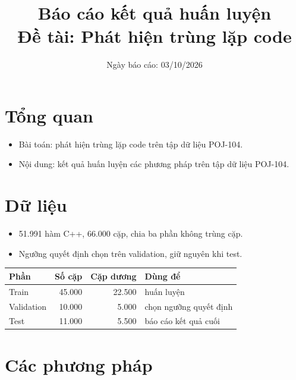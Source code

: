 \documentclass[11pt,a4paper]{article}
\title{\vspace{-1.0cm}\textbf{Báo cáo kết quả huấn luyện}\\[6pt]
       {\normalsize Đề tài: Phát hiện trùng lặp code}}
\date{Ngày báo cáo: 03/10/2026}
\begin{document}
\maketitle
\vspace{-0.8cm}

\section{Tổng quan}

\begin{itemize}
\item Bài toán: phát hiện trùng lặp code trên tập dữ liệu POJ-104.
\item Nội dung: kết quả huấn luyện các phương pháp trên tập dữ liệu POJ-104.
\end{itemize}

\section{Dữ liệu}

\begin{itemize}
\item 51.991 hàm C++, 66.000 cặp, chia ba phần không trùng cặp.
\item Ngưỡng quyết định chọn trên validation, giữ nguyên khi test.
\end{itemize}

{\small
\begin{tabular*}{\textwidth}{@{\extracolsep{\fill}}lrrl@{}}
\toprule
\textbf{Phần} & \textbf{Số cặp} & \textbf{Cặp dương} & \textbf{Dùng để} \\
\midrule
Train      & 45.000 & 22.500 & huấn luyện \\
Validation & 10.000 & 5.000  & chọn ngưỡng quyết định \\
Test       & 11.000 & 5.500  & báo cáo kết quả cuối \\
\bottomrule
\end{tabular*}\par}

\section{Các phương pháp}
\end{document}
